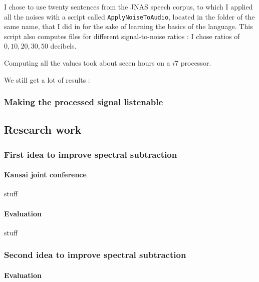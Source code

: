 I chose to use twenty sentences from the \ac{JNAS} speech corpus, to which I applied all the noises with a script called \texttt{ApplyNoiseToAudio}, located in the folder of the same name, that I did in  for the sake of learning the basics of the language.
This script also computes files for different signal-to-noise ratios : I chose ratios of $0, 10, 20, 30, 50$ decibels.

Computing all the values took about secen hours on a $i7$ processor.

We still get a lot of results :  
\subsubsection{Making the processed signal listenable}
\subsection{Research work}
\subsubsection{First idea to improve spectral subtraction}
\paragraph{Kansai joint conference}
stuff
\paragraph{Evaluation}
stuff
\subsubsection{Second idea to improve spectral subtraction}
\paragraph{Evaluation}